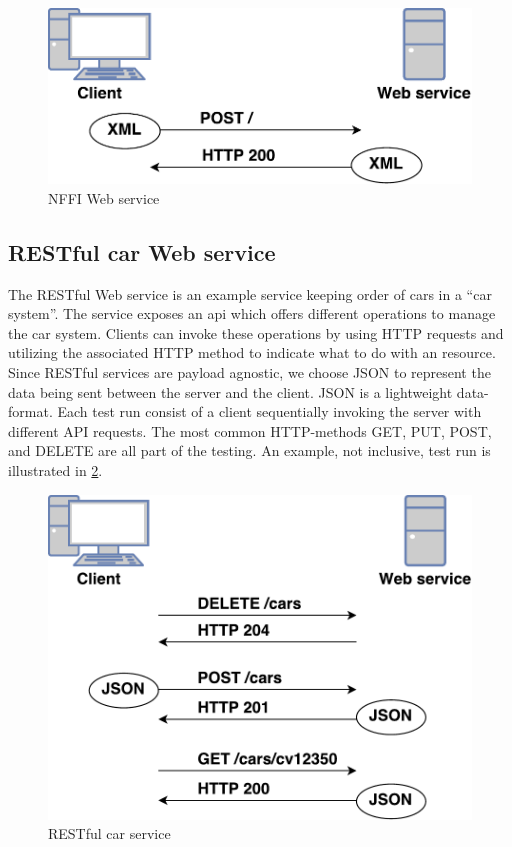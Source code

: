 \begin{figure}[h]
\centering
\includegraphics[scale=0.6]{images/nffi_flow.pdf}
\caption{NFFI Web service}
\label{figure-nffi-flow}
\end{figure}


\subsection{RESTful car Web service}

The RESTful Web service is an example service keeping order of cars in a ``car
system''. The service exposes an \gls{api} which offers different operations to
manage the car system. Clients can invoke these operations by using HTTP
requests and utilizing the associated HTTP method to indicate what to do with an
resource. Since RESTful services are payload agnostic, we choose JSON to
represent the data being sent between the server and the client. JSON is a
lightweight data-format. Each test run consist of a client sequentially invoking
the server with different API requests. The most common HTTP-methods GET, PUT,
POST, and DELETE are all part of the testing. An example, not inclusive, test run
is illustrated in \cref{figure-rest-flow}.

\begin{figure}[h]
\centering
\includegraphics[scale=0.6]{images/rest_flow.pdf}
\caption{RESTful car service}
\label{figure-rest-flow}
\end{figure}


